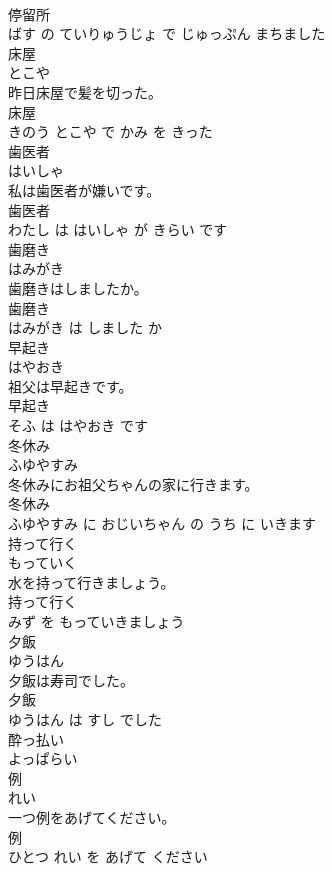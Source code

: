 \documentclass[8pt]{extreport}
\begin{document}
\begin{CJK}{UTF8}{min}
\\	停留所 
\\	ばす の ていりゅうじょ で じゅっぷん まちました			
\\	床屋	
\\	とこや			
\\	昨日床屋で髪を切った。	
\\	床屋 
\\	きのう とこや で かみ を きった			
\\	歯医者	
\\	はいしゃ			
\\	私は歯医者が嫌いです。	
\\	歯医者 
\\	わたし は はいしゃ が きらい です			
\\	歯磨き	
\\	はみがき			
\\	歯磨きはしましたか。	
\\	歯磨き 
\\	はみがき は しました か			
\\	早起き	
\\	はやおき			
\\	祖父は早起きです。	
\\	早起き 
\\	そふ は はやおき です			
\\	冬休み	
\\	ふゆやすみ			
\\	冬休みにお祖父ちゃんの家に行きます。	
\\	冬休み 
\\	ふゆやすみ に おじいちゃん の うち に いきます			
\\	持って行く	
\\	もっていく			
\\	水を持って行きましょう。	
\\	持って行く 
\\	みず を もっていきましょう			
\\	夕飯	
\\	ゆうはん			
\\	夕飯は寿司でした。	
\\	夕飯 
\\	ゆうはん は すし でした			
\\	酔っ払い	
\\	よっぱらい			
\\	例	
\\	れい			
\\	一つ例をあげてください。	
\\	例 
\\	ひとつ れい を あげて ください			

\end{CJK}
\end{document}
